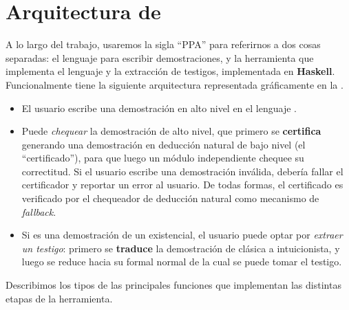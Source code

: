 \section{Arquitectura de \ppaTool{}}

A lo largo del trabajo, usaremos la sigla ``PPA'' para referirnos a dos cosas separadas: \ppaLang{} el lenguaje para escribir demostraciones, y \ppaTool{} la herramienta que implementa el lenguaje y la extracción de testigos,  implementada en \textbf{Haskell}. Funcionalmente tiene la siguiente arquitectura representada gráficamente en la .

\begin{itemize}
    \item El usuario escribe una demostración en alto nivel en el lenguaje \ppaLang{}.
    \item Puede \textit{chequear} la demostración de alto nivel, que primero se \textbf{certifica} generando una demostración en deducción natural de bajo nivel (el ``certificado''), para que luego un módulo independiente chequee su correctitud.
    Si el usuario escribe una demostración inválida, debería fallar el certificador y reportar un error al usuario. De todas formas, el certificado es verificado por el chequeador de deducción natural como mecanismo de \textit{fallback}.
    \item Si es una demostración de un existencial, el usuario puede optar por \textit{extraer un testigo}: primero se \textbf{traduce} la demostración de clásica a intuicionista, y luego se reduce hacia su formal normal de la cual se puede tomar el testigo.
\end{itemize}

Describimos los tipos de las principales funciones que implementan las distintas etapas de la herramienta.

